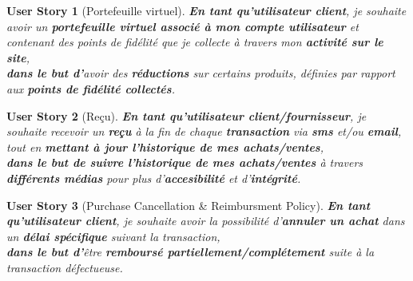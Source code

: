 \documentclass[a4paper,12pt]{book}
\theoremstyle{break}
\newtheorem*{userStory}{User Story}
\theoremstyle{break}
\theoremstyle{break}
\theoremstyle{break}
\theoremstyle{definition}
\theoremstyle{remark}
\begin{document}
\begin{userStory}[Portefeuille virtuel]
\textbf{En tant qu'utilisateur {\color{green}client}}, je souhaite avoir un \textbf{portefeuille virtuel associé à mon compte utilisateur} et contenant des points de fidélité que je collecte à travers mon \textbf{activité sur le site},\\
\indent
\textbf{dans le but d'}avoir des \textbf{réductions} sur certains produits, définies par rapport aux \textbf{points de fidélité collectés}.
\end{userStory}

\begin{userStory}[Reçu]
\textbf{En tant qu'utilisateur {\color{green}client}/{\color{red}fournisseur}}, je souhaite recevoir un \textbf{reçu} à la fin de chaque \textbf{transaction} via \textbf{sms} et/ou \textbf{email}, tout en \textbf{mettant à jour l'historique de mes achats/ventes},\\
\indent
\textbf{dans le but de suivre l'historique de mes achats/ventes} à travers \textbf{différents médias} pour plus d'\textbf{accesibilité} et d'\textbf{intégrité}.
\end{userStory}

\begin{userStory}[Purchase Cancellation \& Reimbursment Policy]
\textbf{En tant qu'utilisateur {\color{green}client}}, je souhaite avoir la possibilité d'\textbf{annuler un achat} dans un \textbf{délai spécifique} suivant la transaction,\\
\indent
\textbf{dans le but d'}être \textbf{remboursé partiellement/complétement} suite à la transaction défectueuse.
\end{userStory}
\end{document}
